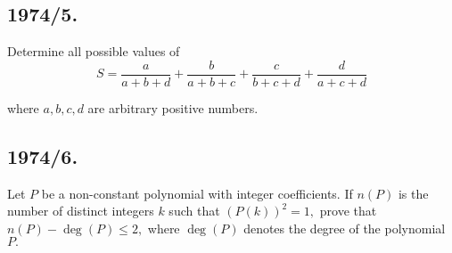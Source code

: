 \documentclass[12pt,thmsa]{article}
\begin{document}
\subsection{1974/5. }

Determine all possible values of
\[
S=\frac{a}{a+b+d}+\frac{b}{a+b+c}+\frac{c}{b+c+d}+\frac{d}{a+c+d}
\]

where $a,b,c,d$ are arbitrary positive numbers.

\subsection{1974/6. }

Let $P$ be a non-constant polynomial with integer coefficients. If $n(P)$ is
the number of distinct integers $k$ such that $(P(k))^{2}=1,$ prove that $%
n(P)-\deg (P)\leq 2,$ where $\deg (P)$ denotes the degree of the polynomial $%
P.$
\end{document}
